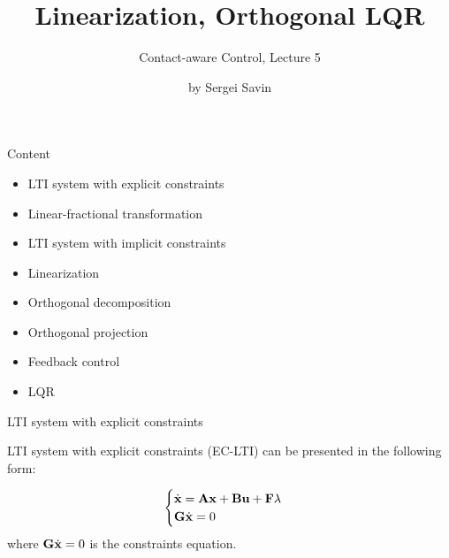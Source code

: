 \documentclass{beamer}
\title{Linearization, Orthogonal LQR}
\subtitle{Contact-aware Control, Lecture 5}
\author{by Sergei Savin}
\date{\mydate}
\begin{document}
\maketitle


\begin{frame}{Content}

\begin{itemize}
\item LTI system with explicit constraints
\item Linear-fractional transformation
\item LTI system with implicit constraints
\item Linearization
\item Orthogonal decomposition
\item Orthogonal projection
\item Feedback control
\item LQR
\end{itemize}

\end{frame}




\begin{frame}{LTI system with explicit constraints}
	\begin{flushleft}
		
		LTI system with explicit constraints (EC-LTI) can be presented in the following form:
		
		\begin{equation}
			\begin{cases}
				\dot{\mathbf{x}}=\mathbf{A}\mathbf{x}+\mathbf{B}\mathbf{u}+\mathbf{F}\lambda 
				\\
				\mathbf{G}\dot{\mathbf{x}}=0
			\end{cases}
		\end{equation}
		where $\mathbf{G}\dot{\mathbf{x}}=0$ is the constraints equation.
	
	\end{flushleft}
\end{frame}
\end{document}
